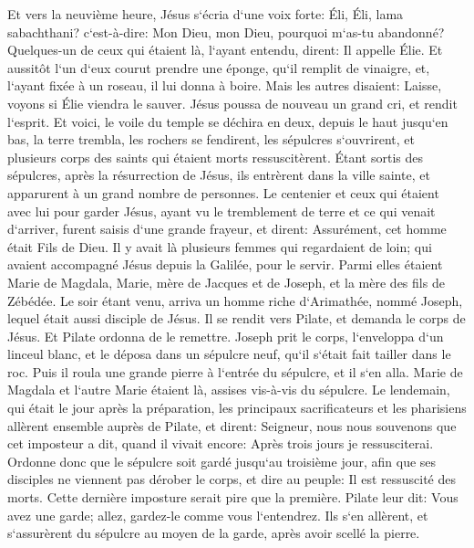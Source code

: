 \verse Et vers la neuvième heure, Jésus s`écria d`une voix forte: Éli, Éli, lama sabachthani? c`est-à-dire: Mon Dieu, mon Dieu, pourquoi m`as-tu abandonné? 
\verse Quelques-un de ceux qui étaient là, l`ayant entendu, dirent: Il appelle Élie. 
\verse Et aussitôt l`un d`eux courut prendre une éponge, qu`il remplit de vinaigre, et, l`ayant fixée à un roseau, il lui donna à boire. 
\verse Mais les autres disaient: Laisse, voyons si Élie viendra le sauver. 
\verse Jésus poussa de nouveau un grand cri, et rendit l`esprit. 
\verse Et voici, le voile du temple se déchira en deux, depuis le haut jusqu`en bas, la terre trembla, les rochers se fendirent, 
\verse les sépulcres s`ouvrirent, et plusieurs corps des saints qui étaient morts ressuscitèrent. 
\verse Étant sortis des sépulcres, après la résurrection de Jésus, ils entrèrent dans la ville sainte, et apparurent à un grand nombre de personnes. 
\verse Le centenier et ceux qui étaient avec lui pour garder Jésus, ayant vu le tremblement de terre et ce qui venait d`arriver, furent saisis d`une grande frayeur, et dirent: Assurément, cet homme était Fils de Dieu. 
\verse Il y avait là plusieurs femmes qui regardaient de loin; qui avaient accompagné Jésus depuis la Galilée, pour le servir. 
\verse Parmi elles étaient Marie de Magdala, Marie, mère de Jacques et de Joseph, et la mère des fils de Zébédée. 
\verse Le soir étant venu, arriva un homme riche d`Arimathée, nommé Joseph, lequel était aussi disciple de Jésus. 
\verse Il se rendit vers Pilate, et demanda le corps de Jésus. Et Pilate ordonna de le remettre. 
\verse Joseph prit le corps, l`enveloppa d`un linceul blanc, 
\verse et le déposa dans un sépulcre neuf, qu`il s`était fait tailler dans le roc. Puis il roula une grande pierre à l`entrée du sépulcre, et il s`en alla. 
\verse Marie de Magdala et l`autre Marie étaient là, assises vis-à-vis du sépulcre. 
\verse Le lendemain, qui était le jour après la préparation, les principaux sacrificateurs et les pharisiens allèrent ensemble auprès de Pilate, 
\verse et dirent: Seigneur, nous nous souvenons que cet imposteur a dit, quand il vivait encore: Après trois jours je ressusciterai. 
\verse Ordonne donc que le sépulcre soit gardé jusqu`au troisième jour, afin que ses disciples ne viennent pas dérober le corps, et dire au peuple: Il est ressuscité des morts. Cette dernière imposture serait pire que la première. 
\verse Pilate leur dit: Vous avez une garde; allez, gardez-le comme vous l`entendrez. 
\verse Ils s`en allèrent, et s`assurèrent du sépulcre au moyen de la garde, après avoir scellé la pierre. 

